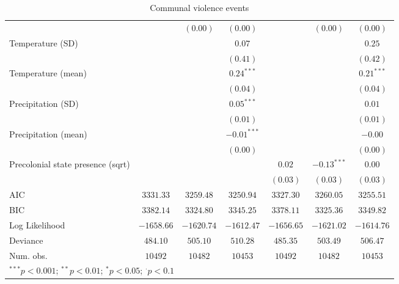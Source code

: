 \begin{sidewaystable}
\begin{center}
{\begin{tabular}{l c c c c c c}
                                  &               & $(0.00)$       & $(0.00)$      &               & $(0.00)$      & $(0.00)$      \\
Temperature (SD)                  &               &                & $0.07$        &               &               & $0.25$        \\
                                  &               &                & $(0.41)$      &               &               & $(0.42)$      \\
Temperature (mean)                &               &                & $0.24^{***}$  &               &               & $0.21^{***}$  \\
                                  &               &                & $(0.04)$      &               &               & $(0.04)$      \\
Precipitation (SD)                &               &                & $0.05^{***}$  &               &               & $0.01$        \\
                                  &               &                & $(0.01)$      &               &               & $(0.01)$      \\
Precipitation (mean)              &               &                & $-0.01^{***}$ &               &               & $-0.00$       \\
                                  &               &                & $(0.00)$      &               &               & $(0.00)$      \\
Precolonial state presence (sqrt) &               &                &               & $0.02$        & $-0.13^{***}$ & $0.00$        \\
                                  &               &                &               & $(0.03)$      & $(0.03)$      & $(0.03)$      \\
\hline
AIC                               & $3331.33$     & $3259.48$      & $3250.94$     & $3327.30$     & $3260.05$     & $3255.51$     \\
BIC                               & $3382.14$     & $3324.80$      & $3345.25$     & $3378.11$     & $3325.36$     & $3349.82$     \\
Log Likelihood                    & $-1658.66$    & $-1620.74$     & $-1612.47$    & $-1656.65$    & $-1621.02$    & $-1614.76$    \\
Deviance                          & $484.10$      & $505.10$       & $510.28$      & $485.35$      & $503.49$      & $506.47$      \\
Num. obs.                         & $10492$       & $10482$        & $10453$       & $10492$       & $10482$       & $10453$       \\
\hline
\multicolumn{7}{l}{\scriptsize{$^{***}p<0.001$; $^{**}p<0.01$; $^{*}p<0.05$; $^{\cdot}p<0.1$}}
\end{tabular}
}
\caption{Communal violence events}
\label{org3}
\end{center}
\end{sidewaystable}
